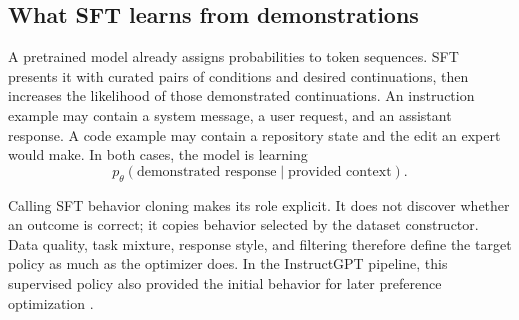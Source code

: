 \subsection{What SFT learns from demonstrations}

A pretrained model already assigns probabilities to token sequences. SFT presents it with
curated pairs of conditions and desired continuations, then increases the likelihood of
those demonstrated continuations. An instruction example may contain a system message, a
user request, and an assistant response. A code example may contain a repository state
and the edit an expert would make. In both cases, the model is learning
\begin{equation}
  p_\theta(\text{demonstrated response}\mid\text{provided context}).
\end{equation}

Calling SFT behavior cloning makes its role explicit. It does not discover whether an
outcome is correct; it copies behavior selected by the dataset constructor. Data quality,
task mixture, response style, and filtering therefore define the target policy as much as
the optimizer does. In the InstructGPT pipeline, this supervised policy also provided the
initial behavior for later preference optimization \citep{ouyang2022instructgpt}.
